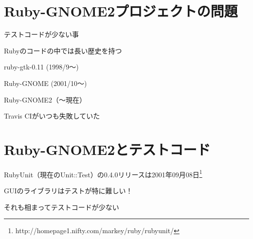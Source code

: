 \section{Ruby-GNOME2プロジェクトの問題}

\begin{frame}
\begin{itemize}
{\Large
\item{} テストコードが少ない事
\item{} Rubyのコードの中では長い歴史を持つ

ruby-gtk-0.11 (1998/9〜)

Ruby-GNOME (2001/10〜)

Ruby-GNOME2（〜現在）
}
{\huge
\item{} Travis CIがいつも失敗していた
}
\end{itemize}
\end{frame}

\section{Ruby-GNOME2とテストコード}

\begin{frame}
\begin{itemize}
{\huge
\item RubyUnit（現在のUnit::Test）の0.4.0リリースは2001年09月08日\footnote{http://homepage1.nifty.com/markey/ruby/rubyunit/}
\item GUIのライブラリはテストが特に難しい！
\item それも相まってテストコードが少ない
}
\end{itemize}
\end{frame}
